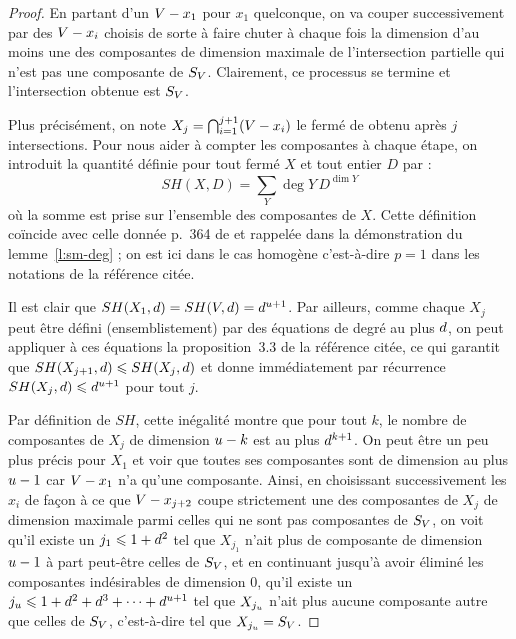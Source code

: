 \begin{proof}
  En partant d'un \( V - x_1 \) pour \( x_1 \) quelconque, on va couper
  successivement par des \( V - x_i \) choisis de sorte à faire chuter à
  chaque fois la dimension d'au moins une des composantes de dimension
  maximale de l'intersection partielle qui n'est pas une composante de \(
    S_V \).  Clairement, ce processus se termine et l'intersection obtenue
  est \( S_V \).

  Plus précisément, on note \( X_j = \bigcap_{i=1}^{j+1} (V - x_i) \) le
  fermé de  obtenu après \( j \) intersections.  Pour nous aider
  à compter les composantes à chaque étape, on introduit la quantité définie
  pour tout fermé \( X \) et tout entier \( D \) par :
  \begin{equation}
    SH(X, D)
    =
    \sum_Y \deg Y \, D^{\dim Y}
  \end{equation}
  où la somme est prise sur l'ensemble des composantes de \( X \). Cette
  définition coïncide avec celle donnée p.~364 de \cite{philz} et rappelée
  dans la démonstration du lemme~\vref{l:sm-deg} ; on est ici dans le cas
  homogène c'est-à-dire \( p = 1 \) dans les notations de la référence citée.

  Il est clair que \( SH(X_1, d) = SH(V, d) = d^{u+1} \).
  Par ailleurs, comme chaque \( X_j \) peut être défini (ensemblistement) par
  des équations de degré au plus \( d \), on peut appliquer à ces
  équations la proposition~3.3 de la référence citée, ce qui garantit que \(
    SH(X_{j+1}, d) \leqslant SH(X_j, d) \) et donne immédiatement par
  récurrence \( SH(X_j, d) \leqslant d^{u+1} \) pour tout \( j \).

  Par définition de \( SH \), cette inégalité montre que pour tout \( k \), le
  nombre de composantes de \( X_j \) de dimension \( u - k \) est au plus
  \( d^{k+1} \).  On peut être un peu plus précis pour \( X_1 \) et voir
  que toutes ses composantes sont de dimension au plus \( u - 1 \) car \(
    V - x_1 \) n'a qu'une composante. Ainsi, en choisissant successivement
  les \( x_i \) de façon à ce que \( V - x_{j+2} \) coupe strictement une
  des composantes de \( X_j \) de dimension maximale parmi celles qui ne sont
  pas composantes de \( S_V \), on voit qu'il existe un \( j_1 \leqslant 1 +
    d^2 \) tel que \( X_{j_1} \) n'ait plus de composante de dimension \(
    u - 1 \) à part peut-être celles de \( S_V \), et en continuant
  jusqu'à avoir éliminé les composantes indésirables de dimension \( 0 \),
  qu'il existe un \( j_u \leqslant 1 + d^2 + d^3 + \dots +
    d^{u+1} \) tel que \( X_{j_u} \) n'ait plus aucune composante
  autre que celles de
  \( S_V \), c'est-à-dire tel que \( X_{j_u} = S_V \).


\end{proof}
